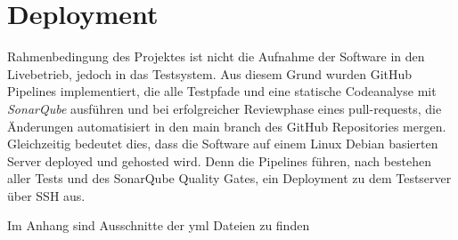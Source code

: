 \section{Deployment}
\label{sec:Einfuehrungsphase}
Rahmenbedingung des Projektes ist nicht die Aufnahme der Software in den Livebetrieb, jedoch in das Testsystem. Aus diesem Grund wurden
GitHub Pipelines implementiert, die alle Testpfade und eine statische Codeanalyse mit \textit{SonarQube} ausführen und bei erfolgreicher Reviewphase eines pull-requests, 
die Änderungen automatisiert in den main branch des GitHub Repositories mergen.
Gleichzeitig bedeutet dies, dass die Software auf einem Linux Debian basierten Server deployed und gehosted wird.
Denn die Pipelines führen, nach bestehen aller Tests und des SonarQube Quality Gates, ein Deployment zu dem Testserver über \acs{SSH} aus. 
\par\smallskip
Im Anhang sind Ausschnitte der yml Dateien zu finden 
